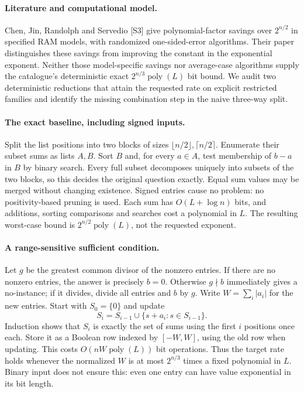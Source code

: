 \documentclass[11pt,a4paper]{article}
\begin{document}
\paragraph{Literature and computational model.}
Chen, Jin, Randolph and Servedio [S3] give polynomial-factor savings over $2^{n/2}$ in specified RAM models, with randomized one-sided-error algorithms. Their paper distinguishes these savings from improving the constant in the exponential exponent. Neither those model-specific savings nor average-case algorithms supply the catalogue's deterministic exact $2^{n/3}\operatorname{poly}(L)$ bit bound. We audit two deterministic reductions that attain the requested rate on explicit restricted families and identify the missing combination step in the naive three-way split.

\paragraph{The exact baseline, including signed inputs.}
Split the list positions into two blocks of sizes $\lfloor n/2\rfloor,\lceil n/2\rceil$. Enumerate their subset sums as lists $A,B$. Sort $B$ and, for every $a\in A$, test membership of $b-a$ in $B$ by binary search. Every full subset decomposes uniquely into subsets of the two blocks, so this decides the original question exactly. Equal sum values may be merged without changing existence. Signed entries cause no problem: no positivity-based pruning is used. Each sum has $O(L+\log n)$ bits, and additions, sorting comparisons and searches cost a polynomial in $L$. The resulting worst-case bound is $2^{n/2}\operatorname{poly}(L)$, not the requested exponent.

\paragraph{A range-sensitive sufficient condition.}
Let $g$ be the greatest common divisor of the nonzero entries. If there are no nonzero entries, the answer is precisely $b=0$. Otherwise $g\nmid b$ immediately gives a no-instance; if it divides, divide all entries and $b$ by $g$. Write $W=\sum_i|a_i|$ for the new entries. Start with $S_0=\{0\}$ and update
\[
 S_i=S_{i-1}\cup\{s+a_i:s\in S_{i-1}\}.
\]
Induction shows that $S_i$ is exactly the set of sums using the first $i$ positions once each. Store it as a Boolean row indexed by $[-W,W]$, using the old row when updating. This costs $O(nW\operatorname{poly}(L))$ bit operations. Thus the target rate holds whenever the normalized $W$ is at most $2^{n/3}$ times a fixed polynomial in $L$. Binary input does not ensure this: even one entry can have value exponential in its bit length.
\end{document}
